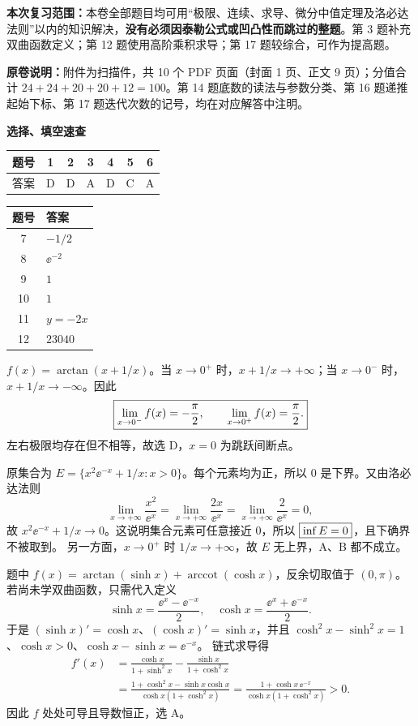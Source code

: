
\renewcommand{\solutiondate}{2026-11-11}

\textbf{本次复习范围：}本卷全部题目均可用“极限、连续、求导、微分中值定理及洛必达法则”以内的知识解决，\textbf{没有必须因泰勒公式或凹凸性而跳过的整题}。第 3 题补充双曲函数定义；第 12 题使用高阶乘积求导；第 17 题较综合，可作为提高题。

\textbf{原卷说明：}附件为扫描件，共 10 个 PDF 页面（封面 1 页、正文 9 页）；分值合计 $24+24+20+20+12=100$。第 14 题底数的读法与参数分类、第 16 题递推起始下标、第 17 题迭代次数的记号，均在对应解答中注明。

\textbf{选择、填空速查}
\begin{center}
\begin{tabular}{c*{6}{c}}
\toprule 题号 & 1 & 2 & 3 & 4 & 5 & 6\\\midrule
答案 & D & D & A & D & C & A\\\bottomrule
\end{tabular}\qquad
\begin{tabular}{cl}
\toprule 题号 & 答案\\\midrule
7 & $-1/2$\\
8 & $\ee^{-2}$\\
9 & $1$\\
10 & $1$\\
11 & $y=-2x$\\
12 & $23040$\\\bottomrule
\end{tabular}
\end{center}

$f(x)=\arctan(x+1/x)$。当 $x\to0^+$ 时，$x+1/x\to+\infty$；当 $x\to0^-$ 时，$x+1/x\to-\infty$。因此
\[
\boxed{\lim_{x\to0^-}f(x)=-\frac\pi2,\qquad
\lim_{x\to0^+}f(x)=\frac\pi2.}
\]
左右极限均存在但不相等，故选 D，$x=0$ 为跳跃间断点。

原集合为 $E=\{x^2\ee^{-x}+1/x:x>0\}$。每个元素均为正，所以 $0$ 是下界。又由洛必达法则
\[
\lim_{x\to+\infty}\frac{x^2}{\ee^x}
=\lim_{x\to+\infty}\frac{2x}{\ee^x}
=\lim_{x\to+\infty}\frac2{\ee^x}=0,
\]
故 $x^2\ee^{-x}+1/x\to0$。这说明集合元素可任意接近 $0$，所以 $\boxed{\inf E=0}$，且下确界不被取到。
另一方面，$x\to0^+$ 时 $1/x\to+\infty$，故 $E$ 无上界，A、B 都不成立。

\newpage
{}
题中 $f(x)=\arctan(\sinh x)+\operatorname{arccot}(\cosh x)$，反余切取值于 $(0,\pi)$。
若尚未学双曲函数，只需代入定义
\[
\sinh x=\frac{\ee^x-\ee^{-x}}2,\quad
\cosh x=\frac{\ee^x+\ee^{-x}}2.
\]
于是 $(\sinh x)'=\cosh x$、$(\cosh x)'=\sinh x$，并且
$\cosh^2x-\sinh^2x=1$、$\cosh x>0$、$\cosh x-\sinh x=\ee^{-x}$。
链式求导得
\begin{align*}
f'(x)
&=\frac{\cosh x}{1+\sinh^2x}-\frac{\sinh x}{1+\cosh^2x}\\
&=\frac{1+\cosh^2x-\sinh x\cosh x}{\cosh x(1+\cosh^2x)}
=\frac{1+\cosh x\,\ee^{-x}}{\cosh x(1+\cosh^2x)}>0.
\end{align*}
因此 $f$ 处处可导且导数恒正，选 A。

